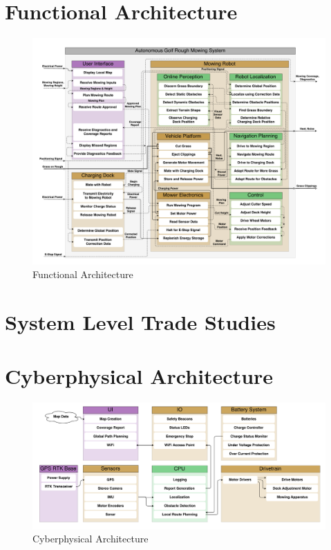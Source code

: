 \documentclass{article}
\begin{document}
\section{Functional Architecture}
\begin{figure}[H]
\includegraphics[scale=0.3]{functional}
\caption{Functional Architecture}
\label{fig:functional}
\end{figure}


\section{System Level Trade Studies}

\section{Cyberphysical Architecture}
\begin{figure}[H]
\includegraphics[scale=0.2]{cyberphysical}
\caption{Cyberphysical Architecture}
\label{fig:cyberphysical}
\end{figure}
\end{document}
